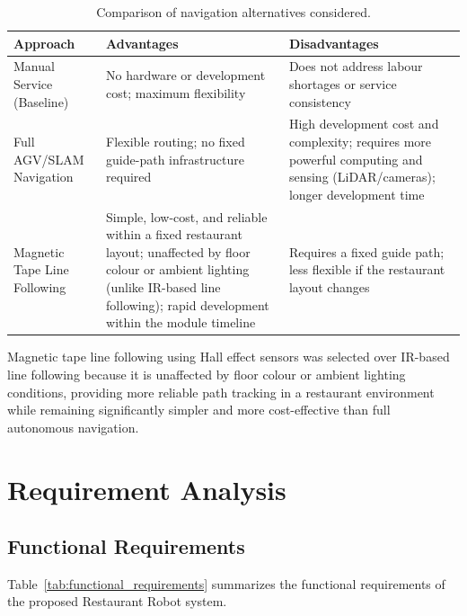 \documentclass[12pt,a4paper]{article}
\begin{document}
\begin{table}[H]
\centering
\caption{Comparison of navigation alternatives considered.}
\renewcommand{\arraystretch}{1.3}
\begin{tabular}{@{}p{3cm}p{5.5cm}p{5.5cm}@{}}
\toprule
\textbf{Approach} & \textbf{Advantages} & \textbf{Disadvantages} \\
\midrule
Manual Service (Baseline) & No hardware or development cost; maximum flexibility & Does not address labour shortages or service consistency \\

Full AGV/SLAM Navigation & Flexible routing; no fixed guide-path infrastructure required & High development cost and complexity; requires more powerful computing and sensing (LiDAR/cameras); longer development time \\

Magnetic Tape Line Following & Simple, low-cost, and reliable within a fixed restaurant layout; unaffected by floor colour or ambient lighting (unlike IR-based line following); rapid development within the module timeline & Requires a fixed guide path; less flexible if the restaurant layout changes \\
\bottomrule
\end{tabular}
\end{table}

Magnetic tape line following using Hall effect sensors was selected
over IR-based line following because it is unaffected by floor colour
or ambient lighting conditions, providing more reliable path tracking
in a restaurant environment while remaining significantly simpler and
more cost-effective than full autonomous navigation.

\section{Requirement Analysis}

\subsection{Functional Requirements}

Table~\ref{tab:functional_requirements} summarizes the functional
requirements of the proposed Restaurant Robot system.
\end{document}
